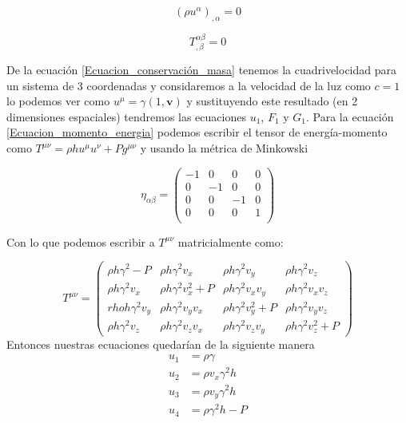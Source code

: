 \documentclass[12pt,a4paper]{book}
\begin{document}
\begin{equation}\label{Ecuacion_conservación_masa}
\left( \rho u^{\alpha} \right)_{, \alpha} =0
\end{equation}

\begin{equation}\label{Ecuacion_momento_energia}
T_{, \beta}^{\alpha \beta}=0
\end{equation}

De la ecuación \ref{Ecuacion_conservación_masa} tenemos la cuadrivelocidad para un sistema de 
3 coordenadas y considaremos a la velocidad de la luz como $c=1$ lo podemos ver como $u^{\mu}=\gamma \left( 1, \textbf{v}\right)$ y sustituyendo este resultado (en 2 dimensiones espaciales) tendremos las ecuaciones $u_1$, $F_1$ y $G_1$. Para la ecuación \ref{Ecuacion_momento_energia} podemos escribir el tensor de energía-momento como $T^{\mu \nu} = \rho h u^{\mu} u^{\nu} + Pg^{\mu \nu}$ y usando la métrica de Minkowski

\begin{equation}
\eta_{\alpha \beta}= 
\begin{pmatrix}
 -1 & 0 & 0 & 0 \\
 0 & -1 & 0 & 0 \\
 0 & 0 & -1 & 0 \\
 0 & 0 & 0 & 1 \\
\end{pmatrix}
\end{equation}

Con lo que podemos escribir a $T^{\mu \nu}$ matricialmente como:

\begin{equation}
T^{\mu \nu} =
\begin{pmatrix}
\rho h \gamma^2-P & \rho h \gamma^2 v_{x}  & \rho h \gamma^2 v_{y} & \rho h \gamma^2 v_{z} \\

\rho h \gamma^2 v_{x} & \rho h \gamma^2 v_{x}^{2}+P & \rho h \gamma^2 v_{x}v_{y} &  \rho h \gamma^2 v_{x}v_{z} \\

rho h \gamma^2 v_{y} & \rho h \gamma^2 v_{y}v_{x} & \rho h \gamma^2 v_{y}^{2}+P & \rho h \gamma^2 v_{y}v_{z}\\

\rho h \gamma^2 v_{z} & \rho h \gamma^2 v_{z}v_{x} & \rho h \gamma^2 v_{z}v_{y} & \rho h \gamma^2 v_{z}^2 + P

\end{pmatrix}
\end{equation}
Entonces nuestras ecuaciones quedarían de la siguiente manera
\begin{align}
u_{1}& = \rho \gamma \\ 
u_{2}& = \rho v_{x} \gamma^{2} h \\ 
u_{3}& = \rho v_{y} \gamma^{2} h \\ 
u_{4}& = \rho \gamma^{2} h - P 
\end{align}
\end{document}
